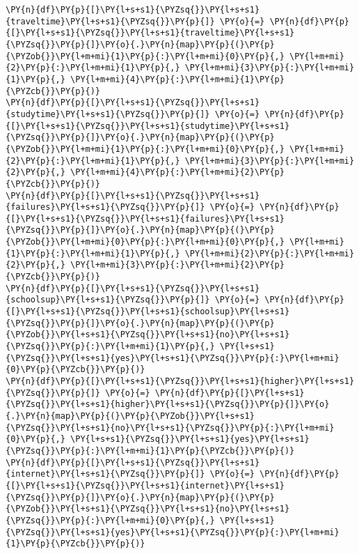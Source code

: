 \begin{tcolorbox}[breakable, size=fbox, boxrule=1pt, pad at break*=1mm,colback=cellbackground, colframe=cellborder]
\begin{Verbatim}[commandchars=\\\{\}]
\PY{n}{df}\PY{p}{[}\PY{l+s+s1}{\PYZsq{}}\PY{l+s+s1}{traveltime}\PY{l+s+s1}{\PYZsq{}}\PY{p}{]} \PY{o}{=} \PY{n}{df}\PY{p}{[}\PY{l+s+s1}{\PYZsq{}}\PY{l+s+s1}{traveltime}\PY{l+s+s1}{\PYZsq{}}\PY{p}{]}\PY{o}{.}\PY{n}{map}\PY{p}{(}\PY{p}{\PYZob{}}\PY{l+m+mi}{1}\PY{p}{:}\PY{l+m+mi}{0}\PY{p}{,} \PY{l+m+mi}{2}\PY{p}{:}\PY{l+m+mi}{1}\PY{p}{,} \PY{l+m+mi}{3}\PY{p}{:}\PY{l+m+mi}{1}\PY{p}{,} \PY{l+m+mi}{4}\PY{p}{:}\PY{l+m+mi}{1}\PY{p}{\PYZcb{}}\PY{p}{)}
\PY{n}{df}\PY{p}{[}\PY{l+s+s1}{\PYZsq{}}\PY{l+s+s1}{studytime}\PY{l+s+s1}{\PYZsq{}}\PY{p}{]} \PY{o}{=} \PY{n}{df}\PY{p}{[}\PY{l+s+s1}{\PYZsq{}}\PY{l+s+s1}{studytime}\PY{l+s+s1}{\PYZsq{}}\PY{p}{]}\PY{o}{.}\PY{n}{map}\PY{p}{(}\PY{p}{\PYZob{}}\PY{l+m+mi}{1}\PY{p}{:}\PY{l+m+mi}{0}\PY{p}{,} \PY{l+m+mi}{2}\PY{p}{:}\PY{l+m+mi}{1}\PY{p}{,} \PY{l+m+mi}{3}\PY{p}{:}\PY{l+m+mi}{2}\PY{p}{,} \PY{l+m+mi}{4}\PY{p}{:}\PY{l+m+mi}{2}\PY{p}{\PYZcb{}}\PY{p}{)}
\PY{n}{df}\PY{p}{[}\PY{l+s+s1}{\PYZsq{}}\PY{l+s+s1}{failures}\PY{l+s+s1}{\PYZsq{}}\PY{p}{]} \PY{o}{=} \PY{n}{df}\PY{p}{[}\PY{l+s+s1}{\PYZsq{}}\PY{l+s+s1}{failures}\PY{l+s+s1}{\PYZsq{}}\PY{p}{]}\PY{o}{.}\PY{n}{map}\PY{p}{(}\PY{p}{\PYZob{}}\PY{l+m+mi}{0}\PY{p}{:}\PY{l+m+mi}{0}\PY{p}{,} \PY{l+m+mi}{1}\PY{p}{:}\PY{l+m+mi}{1}\PY{p}{,} \PY{l+m+mi}{2}\PY{p}{:}\PY{l+m+mi}{2}\PY{p}{,} \PY{l+m+mi}{3}\PY{p}{:}\PY{l+m+mi}{2}\PY{p}{\PYZcb{}}\PY{p}{)}
\PY{n}{df}\PY{p}{[}\PY{l+s+s1}{\PYZsq{}}\PY{l+s+s1}{schoolsup}\PY{l+s+s1}{\PYZsq{}}\PY{p}{]} \PY{o}{=} \PY{n}{df}\PY{p}{[}\PY{l+s+s1}{\PYZsq{}}\PY{l+s+s1}{schoolsup}\PY{l+s+s1}{\PYZsq{}}\PY{p}{]}\PY{o}{.}\PY{n}{map}\PY{p}{(}\PY{p}{\PYZob{}}\PY{l+s+s1}{\PYZsq{}}\PY{l+s+s1}{no}\PY{l+s+s1}{\PYZsq{}}\PY{p}{:}\PY{l+m+mi}{1}\PY{p}{,} \PY{l+s+s1}{\PYZsq{}}\PY{l+s+s1}{yes}\PY{l+s+s1}{\PYZsq{}}\PY{p}{:}\PY{l+m+mi}{0}\PY{p}{\PYZcb{}}\PY{p}{)}
\PY{n}{df}\PY{p}{[}\PY{l+s+s1}{\PYZsq{}}\PY{l+s+s1}{higher}\PY{l+s+s1}{\PYZsq{}}\PY{p}{]} \PY{o}{=} \PY{n}{df}\PY{p}{[}\PY{l+s+s1}{\PYZsq{}}\PY{l+s+s1}{higher}\PY{l+s+s1}{\PYZsq{}}\PY{p}{]}\PY{o}{.}\PY{n}{map}\PY{p}{(}\PY{p}{\PYZob{}}\PY{l+s+s1}{\PYZsq{}}\PY{l+s+s1}{no}\PY{l+s+s1}{\PYZsq{}}\PY{p}{:}\PY{l+m+mi}{0}\PY{p}{,} \PY{l+s+s1}{\PYZsq{}}\PY{l+s+s1}{yes}\PY{l+s+s1}{\PYZsq{}}\PY{p}{:}\PY{l+m+mi}{1}\PY{p}{\PYZcb{}}\PY{p}{)}
\PY{n}{df}\PY{p}{[}\PY{l+s+s1}{\PYZsq{}}\PY{l+s+s1}{internet}\PY{l+s+s1}{\PYZsq{}}\PY{p}{]} \PY{o}{=} \PY{n}{df}\PY{p}{[}\PY{l+s+s1}{\PYZsq{}}\PY{l+s+s1}{internet}\PY{l+s+s1}{\PYZsq{}}\PY{p}{]}\PY{o}{.}\PY{n}{map}\PY{p}{(}\PY{p}{\PYZob{}}\PY{l+s+s1}{\PYZsq{}}\PY{l+s+s1}{no}\PY{l+s+s1}{\PYZsq{}}\PY{p}{:}\PY{l+m+mi}{0}\PY{p}{,} \PY{l+s+s1}{\PYZsq{}}\PY{l+s+s1}{yes}\PY{l+s+s1}{\PYZsq{}}\PY{p}{:}\PY{l+m+mi}{1}\PY{p}{\PYZcb{}}\PY{p}{)}

\end{Verbatim}
\end{tcolorbox}
